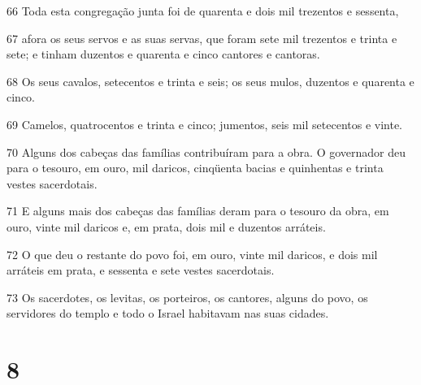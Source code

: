 \par 66 Toda esta congregação junta foi de quarenta e dois mil trezentos e sessenta,
\par 67 afora os seus servos e as suas servas, que foram sete mil trezentos e trinta e sete; e tinham duzentos e quarenta e cinco cantores e cantoras.
\par 68 Os seus cavalos, setecentos e trinta e seis; os seus mulos, duzentos e quarenta e cinco.
\par 69 Camelos, quatrocentos e trinta e cinco; jumentos, seis mil setecentos e vinte.
\par 70 Alguns dos cabeças das famílias contribuíram para a obra. O governador deu para o tesouro, em ouro, mil daricos, cinqüenta bacias e quinhentas e trinta vestes sacerdotais.
\par 71 E alguns mais dos cabeças das famílias deram para o tesouro da obra, em ouro, vinte mil daricos e, em prata, dois mil e duzentos arráteis.
\par 72 O que deu o restante do povo foi, em ouro, vinte mil daricos, e dois mil arráteis em prata, e sessenta e sete vestes sacerdotais.
\par 73 Os sacerdotes, os levitas, os porteiros, os cantores, alguns do povo, os servidores do templo e todo o Israel habitavam nas suas cidades.

\chapter{8}

